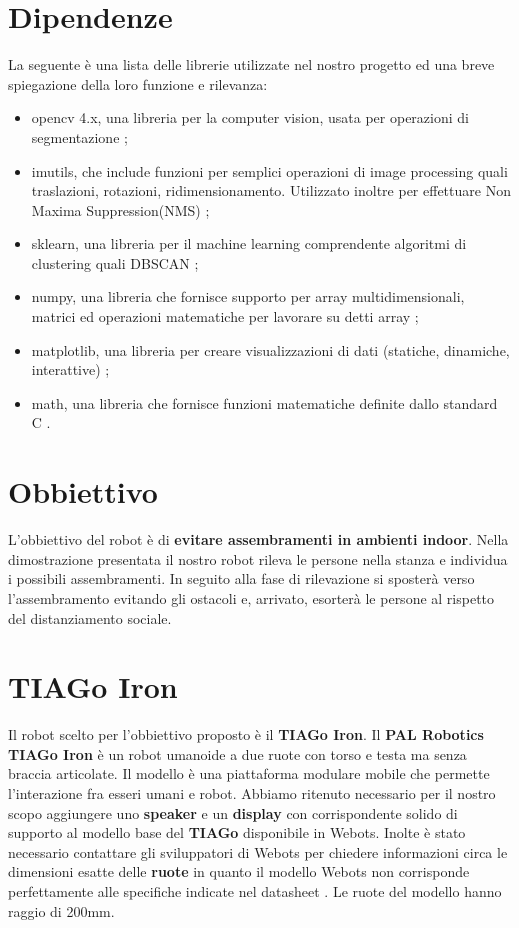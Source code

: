 \documentclass[a4paper]{article}
\begin{document}
	\section{Dipendenze}
	La seguente è una lista delle librerie utilizzate nel nostro progetto ed una breve spiegazione della loro funzione e rilevanza:
	
	\begin{itemize}
		\item opencv 4.x, una libreria per la computer vision, usata per operazioni di segmentazione \cite{opencv};
		\item imutils, che include funzioni per semplici operazioni di image processing quali traslazioni, rotazioni, ridimensionamento. Utilizzato inoltre per effettuare Non Maxima Suppression(NMS) \cite{imutils};
		\item sklearn, una libreria per il machine learning comprendente algoritmi di clustering quali DBSCAN \cite{scikit};
		\item numpy, una libreria che fornisce supporto per array multidimensionali, matrici ed operazioni matematiche per lavorare su detti array \cite{numpy};
		\item matplotlib, una libreria per creare visualizzazioni di dati (statiche, dinamiche, interattive) \cite{matplotlib};
		\item math, una libreria che fornisce funzioni matematiche definite dallo standard C \cite{math}.
	\end{itemize}

	\section{Obbiettivo}
	L'obbiettivo del robot è di \textbf{evitare assembramenti in ambienti indoor}. \newline
	Nella dimostrazione presentata il nostro robot rileva le persone nella stanza e individua i possibili assembramenti. In seguito alla fase di rilevazione si sposterà verso l'assembramento evitando gli ostacoli e, arrivato, esorterà le persone al rispetto del distanziamento sociale.
	
	\section{TIAGo Iron} 
	Il robot scelto per l'obbiettivo proposto è il \textbf{TIAGo Iron}. \newline Il \textbf{PAL Robotics TIAGo Iron} \cite{tiagoiron} è un robot umanoide a due ruote con torso e testa ma senza braccia articolate. Il modello è una piattaforma modulare mobile che permette l'interazione fra esseri umani e robot. \newline
	Abbiamo ritenuto necessario per il nostro scopo aggiungere uno \textbf{speaker} e un \textbf{display} con corrispondente solido di supporto al modello base del \textbf{TIAGo} disponibile in Webots.
	Inolte è stato necessario contattare gli sviluppatori di Webots per chiedere informazioni circa le dimensioni esatte delle \textbf{ruote} in quanto il modello Webots non corrisponde perfettamente alle specifiche indicate nel datasheet \cite{Tiago IRON datasheet}. Le ruote del modello hanno raggio di 200mm. 
	
\end{document}
